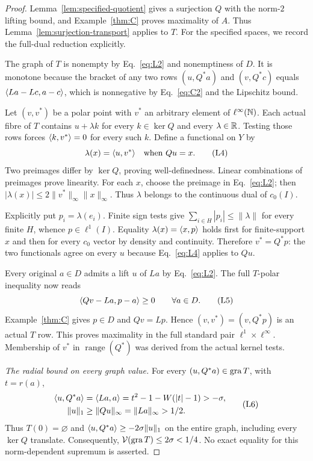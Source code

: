 \begin{proof}
Lemma~\ref{lem:specified-quotient} gives a surjection $Q$ with the
norm-$2$ lifting bound, and Example~\ref{thm:C} proves maximality
of $A$. Thus Lemma~\ref{lem:surjection-transport} applies to $T$.
For the specified spaces, we record the full-dual reduction explicitly.

The graph of $T$ is nonempty by
Eq.~\eqref{eq:L2} and nonemptiness of $D$. It is monotone because the
bracket of any two rows $(u,Q^*a)$ and $(v,Q^*c)$ equals
$\langle La-Lc,a-c\rangle$, which is nonnegative by Eq.~\eqref{eq:C2} and the Lipschitz bound.

Let $(v,v^*)$ be a polar point with $v^*$ an arbitrary element of
$\ell^\infty(\mathbb N)$. Each actual fibre of $T$ contains $u+\lambda k$ for
every $k\in\ker Q$ and every $\lambda\in\mathbb R$. Testing those rows forces
$\langle k,v^*\rangle=0$ for every such $k$. Define a functional on $Y$ by
\begin{equation}
\lambda(x)=\langle u,v^*\rangle\quad\text{when }Qu=x.
\tag{L4}\label{eq:L4}
\end{equation}
Two preimages differ by $\ker Q$, proving well-definedness. Linear
combinations of preimages prove linearity. For each $x$, choose the
preimage in Eq.~\eqref{eq:L2}; then
$|\lambda(x)|\le2\|v^*\|_\infty\|x\|_\infty$. Thus $\lambda$ belongs to
the continuous dual of $c_0(I)$.

Explicitly put $p_i=\lambda(e_i)$. Finite sign tests give
$\sum_{i\in H}|p_i|\le\|\lambda\|$ for every finite $H$, whence
$p\in\ell^1(I)$. Equality $\lambda(x)=\langle x,p\rangle$ holds first for
finite-support $x$ and then for every $c_0$ vector by density and continuity.
Therefore $v^*=Q^*p$: the two functionals agree on every $u$ because
Eq.~\eqref{eq:L4} applies to $Qu$.

Every original $a\in D$ admits a lift $u$ of $La$ by Eq.~\eqref{eq:L2}.
The full $T$-polar inequality now reads
\begin{equation}
\langle Qv-La,p-a\rangle\ge0\qquad\forall a\in D.
\tag{L5}\label{eq:L5}
\end{equation}
Example~\ref{thm:C} gives $p\in D$ and $Qv=Lp$. Hence
$(v,v^*)=(v,Q^*p)$ is an actual $T$ row. This proves maximality in the
full standard pair $\ell^1\times\ell^\infty$. Membership of $v^*$ in
$\operatorname{range}(Q^*)$ was derived from the actual kernel tests.

\noindent\textit{The radial bound on every graph value.}
\label{sec:L3}
For every $(u,Q^*a)\in\operatorname{gra} T$, with $t=r(a)$,
\begin{equation}
\begin{aligned}
\langle u,Q^*a\rangle&=\langle La,a\rangle
 =t^2-1-W(|t|-1)>-\sigma,\\
\|u\|_1&\ge\|Qu\|_\infty=\|La\|_\infty>1/2.
\end{aligned}
\tag{L6}\label{eq:L6}
\end{equation}
Thus $T(0)=\varnothing$ and $\langle u,Q^*a\rangle\ge-2\sigma\|u\|_1$ on
the entire graph, including every $\ker Q$ translate. Consequently,
$\mathcal V(\operatorname{gra} T)\le2\sigma<1/4$. No exact equality for this
norm-dependent supremum is asserted.


\end{proof}
